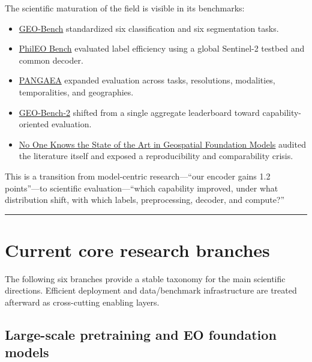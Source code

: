 \documentclass[
  a4paper,
  11pt]{article}
\providecommand{\tightlist}{%
  \setlength{\itemsep}{0pt}\setlength{\parskip}{0pt}}
\begin{document}
The scientific maturation of the field is visible in its benchmarks:

\begin{itemize}
\tightlist
\item
  \href{https://proceedings.neurips.cc/paper_files/paper/2023/hash/a0644215d9cff6646fa334dfa5d29c5a-Abstract-Datasets_and_Benchmarks.html}{GEO-Bench}
  standardized six classification and six segmentation tasks.
\item
  \href{https://arxiv.org/abs/2401.04464}{PhilEO Bench} evaluated label
  efficiency using a global Sentinel-2 testbed and common decoder.
\item
  \href{https://arxiv.org/abs/2412.04204}{PANGAEA} expanded evaluation
  across tasks, resolutions, modalities, temporalities, and geographies.
\item
  \href{https://arxiv.org/html/2511.15658v1}{GEO-Bench-2} shifted from a
  single aggregate leaderboard toward capability-oriented evaluation.
\item
  \href{https://arxiv.org/html/2605.12678v1}{No One Knows the State of
  the Art in Geospatial Foundation Models} audited the literature itself
  and exposed a reproducibility and comparability crisis.
\end{itemize}

This is a transition from model-centric research---``our encoder gains
1.2 points''---to scientific evaluation---``which capability improved,
under what distribution shift, with which labels, preprocessing,
decoder, and compute?''

\begin{center}\rule{0.5\linewidth}{0.5pt}\end{center}

\hypertarget{current-core-research-branches}{%
\section{Current core research
branches}\label{current-core-research-branches}}

The following six branches provide a stable taxonomy for the main
scientific directions. Efficient deployment and data/benchmark
infrastructure are treated afterward as cross-cutting enabling layers.

\hypertarget{large-scale-pretraining-and-eo-foundation-models}{%
\subsection{Large-scale pretraining and EO foundation
models}\label{large-scale-pretraining-and-eo-foundation-models}}
\end{document}
